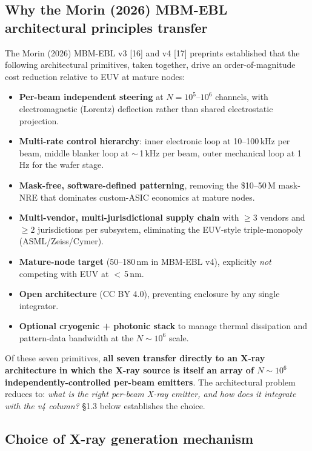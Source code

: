 \documentclass[11pt,letterpaper]{article}
\begin{document}
\subsection{Why the Morin (2026) MBM-EBL architectural principles transfer}

The Morin (2026) MBM-EBL v3 [16] and v4 [17] preprints established that the following architectural primitives, taken together, drive an order-of-magnitude cost reduction relative to EUV at mature nodes:

\begin{itemize}[leftmargin=1.6em]
  \item \textbf{Per-beam independent steering} at $N = 10^5$--$10^6$ channels, with electromagnetic (Lorentz) deflection rather than shared electrostatic projection.
  \item \textbf{Multi-rate control hierarchy}: inner electronic loop at 10--100\,kHz per beam, middle blanker loop at $\sim$\,1\,kHz per beam, outer mechanical loop at 1\,Hz for the wafer stage.
  \item \textbf{Mask-free, software-defined patterning}, removing the \$10--50\,M mask-NRE that dominates custom-ASIC economics at mature nodes.
  \item \textbf{Multi-vendor, multi-jurisdictional supply chain} with $\geq 3$ vendors and $\geq 2$ jurisdictions per subsystem, eliminating the EUV-style triple-monopoly (ASML/Zeiss/Cymer).
  \item \textbf{Mature-node target} (50--180\,nm in MBM-EBL v4), explicitly \textit{not} competing with EUV at $<$\,5\,nm.
  \item \textbf{Open architecture} (CC BY 4.0), preventing enclosure by any single integrator.
  \item \textbf{Optional cryogenic + photonic stack} to manage thermal dissipation and pattern-data bandwidth at the $N \sim 10^6$ scale.
\end{itemize}

Of these seven primitives, \textbf{all seven transfer directly to an X-ray architecture in which the X-ray source is itself an array of $N \sim 10^6$ independently-controlled per-beam emitters}. The architectural problem reduces to: \textit{what is the right per-beam X-ray emitter, and how does it integrate with the v4 column?} \S 1.3 below establishes the choice.

\subsection{Choice of X-ray generation mechanism}
\end{document}
